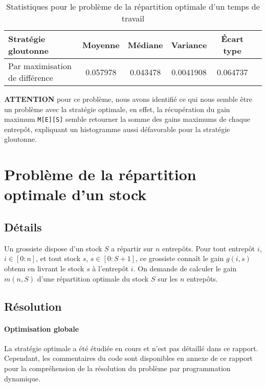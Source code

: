 \documentclass[a4paper,english,french]{article}
\begin{document}
\begin{center}
\begin{table}[htbp]
    \centering
    \begin{tabular}{lccccc}
        \toprule
        Stratégie gloutonne             & Moyenne   & Médiane   & Variance      & Écart type    \\
        \midrule
        Par maximisation de différence  & 0.057978 & 0.043478 & 0.0041908    & 0.064737      \\
        \bottomrule
    \end{tabular}
    \caption{Statistiques pour le problème de la répartition optimale d'un temps de travail}
\end{table}
\end{center}

\textbf{ATTENTION} pour ce problème, nous avons identifié ce qui nous semble être un problème avec la stratégie optimale, en effet, la récupération du gain maximum \texttt{M[E][S]} semble retourner la somme des gains maximums de chaque entrepôt, expliquant un histogramme aussi défavorable pour la stratégie gloutonne.

\section{Problème de la répartition optimale d'un stock} \label{sec:stock}

\subsection*{Détails}

Un grossiste dispose d’un stock $S$ a répartir sur $n$ entrepôts. Pour tout entrepôt $i$, $i \in [0:n]$, et tout stock $s$, $s \in [0:S + 1]$, ce grossiste connaît le gain $g(i,s)$ obtenu en livrant le stock $s$ à l'entrepôt $i$. On demande de calculer le gain $m(n,S)$ d’une répartition optimale du stock $S$ sur les $n$ entrepôts.

\subsection*{Résolution}

\paragraph*{Optimisation globale} La stratégie optimale a été étudiée en cours et n'est pas détaillé dans ce rapport. Cependant, les commentaires du code sont disponibles en annexe de ce rapport pour la compréhension de la résolution du problème par programmation dynamique.
\end{document}
